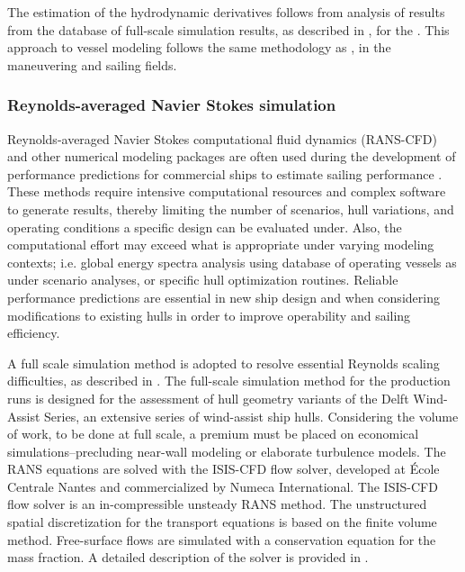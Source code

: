\documentclass[twoside,twocolumn]{article}
\begin{document}
	The estimation of the hydrodynamic derivatives follows from analysis of results from the database of full-scale simulation results, as described in \cite{Kolk18c,Kolk19d}, for the \DWA. This approach to vessel modeling follows the same methodology as \citet{Tsakonas1959,Jacobs1966,Inoue1981,Keuning1998,Tox11}, in the maneuvering and sailing fields.
	
	\subsubsection{Reynolds-averaged Navier Stokes simulation}
	
	Reynolds-averaged Navier Stokes computational fluid dynamics (RANS-CFD) and other numerical modeling packages are often used during the development of performance predictions for commercial ships to estimate sailing performance \citep{Tezdogan2015,Eggers16,Kolk18c}. These methods require intensive computational resources and complex software to generate results, thereby limiting the number of scenarios, hull variations, and operating conditions a specific design can be evaluated under. Also, the computational effort may exceed what is appropriate under varying modeling contexts; i.e. global energy spectra analysis using database of operating vessels as under scenario analyses, or specific hull optimization routines. Reliable performance predictions are essential in new ship design and when considering modifications to existing hulls in order to improve operability and sailing efficiency. 
	
	A full scale simulation method is adopted to resolve essential Reynolds scaling difficulties, as described in \cite{Kolk19d}. The full-scale simulation method for the production runs is designed for the assessment of hull geometry variants of the Delft Wind-Assist Series, an extensive series of wind-assist ship hulls. Considering the volume of work, to be done at full scale, a premium must be placed on economical simulations--precluding near-wall modeling or elaborate turbulence models. The RANS equations are solved with the ISIS-CFD flow solver, developed at \'{E}cole Centrale Nantes and commercialized by Numeca International. The ISIS-CFD flow solver is an in-compressible unsteady RANS method. The unstructured spatial discretization for the transport equations is based on the finite volume method. Free-surface flows are simulated with a conservation equation for the mass fraction. A detailed description of the solver is provided in \cite{Den05,Den06,Que07,Duv03}.
	
\end{document}

